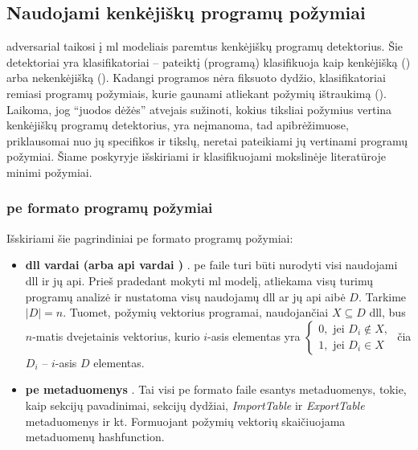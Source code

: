 \subsection{Naudojami kenkėjiškų programų požymiai}\label{sec:literature:features}
\Gls{adversarial} taikosi į \acs{ml} modeliais paremtus kenkėjiškų programų detektorius. Šie detektoriai yra klasifikatoriai -- pateiktį (programą) klasifikuoja kaip kenkėjišką () arba nekenkėjišką (). Kadangi programos nėra fiksuoto dydžio, klasifikatoriai remiasi programų požymiais, kurie gaunami atliekant požymių ištraukimą (). Laikoma, jog \enquote{juodos dėžės} atvejais sužinoti, kokius tiksliai požymius vertina kenkėjiškų programų detektorius, yra neįmanoma, tad  apibrėžimuose, priklausomai nuo jų specifikos ir tikslų, neretai pateikiami jų vertinami programų požymiai. Šiame poskyryje išskiriami ir klasifikuojami mokslinėje literatūroje minimi požymiai.

\subsubsection{\acs{pe} formato programų požymiai}\label{sec:literature:features:pe}
Išskiriami šie pagrindiniai \acs{pe} formato programų požymiai:
\begin{itemize}
    \item \textbf{\acs{dll} vardai (arba \acs{api} vardai \cite{huGeneratingAdversarialMalware2017})} \cite{zhongMalFoxCamouflagedAdversarial2024}. \acs{pe} faile turi būti nurodyti visi naudojami \acs{dll} ir jų \acs{api}. Prieš pradedant mokyti \acs{ml} modelį, atliekama visų turimų programų analizė ir nustatoma visų naudojamų \acs{dll} ar jų \acs{api} aibė $D$. Tarkime $|D| = n$. Tuomet, požymių vektorius programai, naudojančiai $X \subseteq D$ \acs{dll}, bus $n$-matis dvejetainis vektorius, kurio $i$-asis elementas yra $\begin{cases}
        0, \text{ jei } D_i \not \in X, \\
        1, \text{ jei } D_i \in X
    \end{cases}$ čia $D_i$ -- $i$-asis $D$ elementas.
    \item \textbf{\acs{pe} metaduomenys} \cite{andersonLearningEvadeStatic2018}. Tai visi \acs{pe} formato faile esantys metaduomenys, tokie, kaip sekcijų pavadinimai, sekcijų dydžiai, \textit{ImportTable} ir \textit{ExportTable} metaduomenys ir kt. Formuojant požymių vektorių skaičiuojama metaduomenų \gls{hashfunction}.
\end{itemize}

